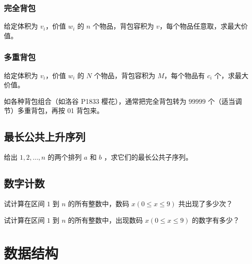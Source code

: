 \documentclass{probook}
\begin{document}
\begin{multicols}{2}


\subsection{完全背包}

给定体积为 $v_i$，价值 $w_i$ 的 $n$ 个物品，背包容积为 $v$，每个物品任意取，求最大价值。



\subsection{多重背包}

给定体积为 $v_i$，价值 $w_i$ 的 $N$ 个物品，背包容积为 $M$，每个物品有 $c_i$ 个，求最大价值。

如各种背包组合（如洛谷 P1833 樱花），通常把完全背包转为 $99999$ 个（适当调节）多重背包，再按 01 背包来。



\section{最长公共上升序列}

给出 $1,2,\ldots,n$ 的两个排列 $a$ 和 $b$ ，求它们的最长公共子序列。



\section{数字计数}

试计算在区间 $1$ 到 $n$ 的所有整数中，数码 $x(0 \leqslant x \leqslant 9)$ 共出现了多少次？



试计算在区间 $1$ 到 $n$ 的所有整数中，出现数码 $x(0 \leqslant x \leqslant 9)$ 的数字有多少？









\chapter{数据结构}


\end{multicols}
\end{document}
